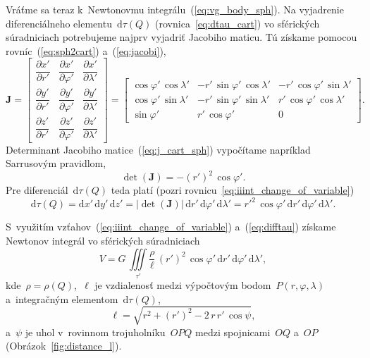 \documentclass[a4paper, 12pt]{book}
\newcommand{\diff}{\mathrm d}
\begin{document}
Vráťme sa teraz k~Newtonovmu integrálu~(\ref{eq:vg_body_sph}).  Na vyjadrenie 
diferenciálneho elementu~$\diff \tau(Q)$ (rovnica~\ref{eq:dtau_cart}) vo 
sférických súradniciach potrebujeme najprv vyjadriť Jacobiho maticu.  Tú 
získame pomocou rovníc~(\ref{eq:sph2cart}) a~(\ref{eq:jacobi}),
%
\begin{equation}
\label{eq:j_cart_sph}
\mathbf{J} =
\begin{bmatrix}
\dfrac{\partial x'}{\partial{r'}} & \dfrac{\partial x'}{\partial \varphi'} 
& \dfrac{\partial x'}{\partial \lambda'}\\[2ex]
%
\dfrac{\partial y'}{\partial{r'}} & \dfrac{\partial y'}{\partial{\varphi'}} 
& \dfrac{\partial y'}{\partial \lambda'}\\[2ex]
%
\dfrac{\partial z'}{\partial{r'}} & \dfrac{\partial z'}{\partial{\varphi'}} 
& \dfrac{\partial z'}{\partial \lambda'}
\end{bmatrix}
%
=
%
\begin{bmatrix}
\cos\varphi' \, \cos\lambda' & -r' \, \sin\varphi' \, \cos\lambda' & -r' \, 
\cos\varphi' \, \sin\lambda'
\\[2ex]
\cos\varphi' \, \sin\lambda' & -r' \, \sin\varphi' \, \sin\lambda' &  r' \, 
\cos\varphi' \, \cos\lambda'
\\[2ex]
 \sin\varphi'                & r' \, \cos\varphi'                  & 0
\end{bmatrix}
%
{.}
%
\end{equation}
%
Determinant Jacobiho matice~(\ref{eq:j_cart_sph}) vypočítame napríklad 
Sarrusovým pravidlom,
%
\begin{equation}
\det (\mathbf{J}) = -(r')^2 \, \cos\varphi'{.}
\end{equation}
%
Pre diferenciál~$\diff \tau(Q)$ teda platí (pozri 
rovnicu~\ref{eq:iiint_change_of_variable})
%
\begin{equation}
\label{eq:difftau}
\diff \tau(Q) = \diff x' \, \diff y' \, \diff z' = | \det (\mathbf{J}) | \, 
\diff r' \, \diff \varphi' \, \diff \lambda' = r'^2 \, \cos\varphi' \, \diff r' 
\, \diff \varphi' \, \diff \lambda'{.}
\end{equation}

S~využitím vzťahov~(\ref{eq:iiint_change_of_variable}) a~(\ref{eq:difftau}) 
získame Newtonov integrál vo sférických súradniciach
%
\begin{equation}
\label{eq:vg_body_sph}
V = G \, \iiint\limits_{\tau'} \frac{\rho}{\ell} \, (r')^2 \, \cos\varphi' \, 
\diff r' \, \diff \varphi' \, \diff \lambda'{,}
\end{equation}
%
kde~$\rho = \rho(Q)$,~$\ell$ je vzdialenosť medzi výpočtovým bodom~$P(r, 
\varphi, \lambda)$ a~integračným elementom~$\diff\tau(Q)$,
%
\begin{equation}
\label{eq:l_sph}
\ell = \sqrt{r^2 + (r')^2 - 2 \, r \, r' \, \cos\psi}{,}
\end{equation}
%
a~$\psi$ je uhol v~rovinnom trojuholníku~$OPQ$ medzi spojnicami~$OQ$ a~$OP$ 
(Obrázok~\ref{fig:distance_l}).
\end{document}
